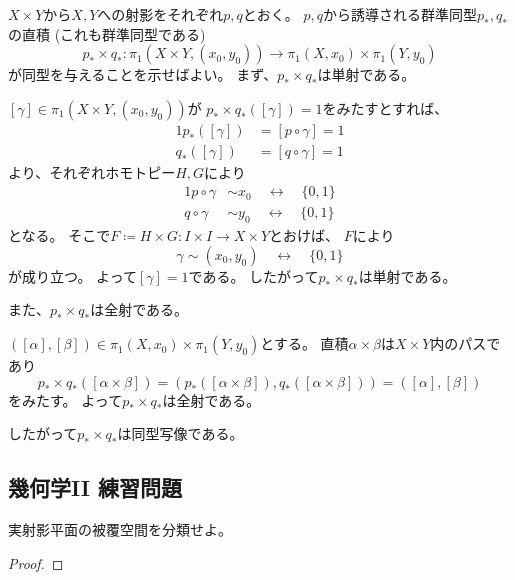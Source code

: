 \documentclass[report]{jlreq}
\begin{document}
\begin{answer}
    $X \times Y$から$X, Y$への射影をそれぞれ$p, q$とおく。
    $p, q$から誘導される群準同型$p_*, q_*$の直積 (これも群準同型である)
    \begin{equation}
        p_* \times q_* \colon \pi_1(X \times Y, (x_0, y_0))
            \to \pi_1(X, x_0) \times \pi_1(Y, y_0)
    \end{equation}
    が同型を与えることを示せばよい。
    まず、$p_* \times q_*$は単射である。
    \begin{innerproof}
        $[\gamma] \in \pi_1(X \times Y, (x_0, y_0))$が
        $p_* \times q_* ([\gamma]) = 1$をみたすとすれば、
        \begin{alignat}{1}
            p_*([\gamma]) &= [p \circ \gamma] = 1 \\
            q_*([\gamma]) &= [q \circ \gamma] = 1
        \end{alignat}
        より、それぞれホモトピー$H, G$により
        \begin{alignat}{1}
            p \circ \gamma &\sim x_0 \quad \rel \quad \{ 0, 1 \} \\
            q \circ \gamma &\sim y_0 \quad \rel \quad \{ 0, 1 \}
        \end{alignat}
        となる。
        そこで$F \coloneqq H \times G \colon I \times I \to X \times Y$とおけば、
        $F$により
        \begin{equation}
            \gamma \sim (x_0, y_0) \quad \rel \quad \{ 0, 1 \}
        \end{equation}
        が成り立つ。
        よって$[\gamma] = 1$である。
        したがって$p_* \times q_*$は単射である。
    \end{innerproof}
    また、$p_* \times q_*$は全射である。
    \begin{innerproof}
        $([\alpha], [\beta]) \in \pi_1(X, x_0) \times \pi_1(Y, y_0)$とする。
        直積$\alpha \times \beta$は$X \times Y$内のパスであり
        \begin{equation}
            p_* \times q_*([\alpha \times \beta])
                = (p_*([\alpha \times \beta]), q_*([\alpha \times \beta]))
                = ([\alpha], [\beta])
        \end{equation}
        をみたす。
        よって$p_* \times q_*$は全射である。
    \end{innerproof}
    したがって$p_* \times q_*$は同型写像である。
\end{answer}

\subsection{幾何学II 練習問題}

\begin{problem}
    実射影平面の被覆空間を分類せよ。
\end{problem}

\begin{proof}
    \TODO{}
\end{proof}
\end{document}

